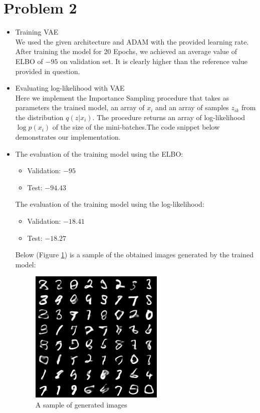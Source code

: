 \section*{Problem 2}
\begin{itemize}
     \item[A.]{Training VAE}\\
     We used the given architecture and ADAM with the provided learning rate. After training the model for 20 Epochs, we achieved an average value of ELBO of $-95$ on validation set. It is clearly higher than the reference value provided in question.  
     
     \item[B.1]{Evaluating log-likelihood with VAE}\\
     Here we implement the Importance Sampling procedure that takes as parameters the trained model, an array of $x_i$ and an array of samples $z_{ik}$ from the distribution $q(z|x_i)$. The procedure returns an array of log-likelihood $\log p(x_i)$  of the size of the mini-batches.The code snippet below demonstrates our implementation. 
     
     
     
     \item[B.2]
     The evaluation of the training model using the ELBO:
     \begin{itemize}
         \item [a.] Validation: $-95$
         \item [b.] Test: $-94.43$
     \end{itemize}
     The evaluation of the training model using the log-likelihood:
     \begin{itemize}
         \item [a.] Validation: $-18.41$
         \item [b.] Test: $-18.27$
     \end{itemize}
     Below (Figure \ref{fig:gen_sample}) is a sample of the obtained images generated by the trained model:
\begin{figure}
\centering
  \includegraphics[scale=1]{sample_19.png}
  \caption{A sample of generated images}
  \label{fig:gen_sample}
\end{figure}
\end{itemize}
